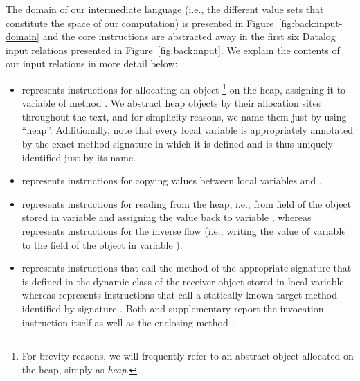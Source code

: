 The domain of our intermediate language (i.e., the different value sets that constitute the space of our computation) is presented in Figure~\ref{fig:back:input-domain} and the core instructions are abstracted away in the first six Datalog input relations presented in Figure~\ref{fig:back:input}. We explain the contents of our input relations in more detail below:

\begin{itemize}
\item {} represents instructions for allocating an object \footnote{For brevity reasons, we will frequently refer to an abstract object allocated on the heap, simply as \emph{heap}.} on the heap, assigning it to variable  of method . We abstract heap objects by their allocation sites throughout the text, and for simplicity reasons, we name them just by using ``heap''. Additionally, note that every local variable is appropriately annotated by the exact method signature in which it is defined and is thus uniquely identified just by its name.

\item {} represents instructions for copying values between local variables  and .

\item {} represents instructions for reading from the heap, i.e., from field  of the object stored in variable  and assigning the value back to variable , whereas  represents instructions for the inverse flow (i.e., writing the value of variable  to the field  of the object in variable ).

\item {} represents instructions that call the method of the appropriate signature  that is defined in the dynamic class of the receiver object stored in local variable  whereas  represents instructions that call a statically known target method identified by signature . Both  and  supplementary report the invocation instruction  itself as well as the enclosing method .
\end{itemize}

